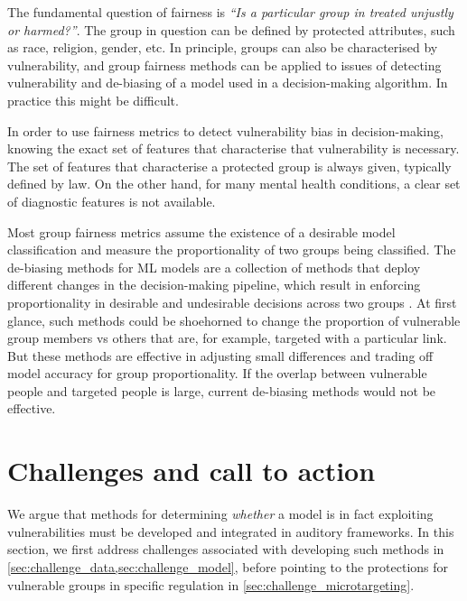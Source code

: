 \documentclass[11pt,theapa]{article}
\theoremstyle{plain}
\begin{document}
The fundamental question of fairness is \emph{``Is a particular group in treated unjustly or harmed?''}. The group in question can be defined by protected attributes, such as race, religion, gender, etc. In principle, groups can also be characterised by vulnerability, and group fairness methods can be applied to issues of detecting vulnerability and de-biasing of a model used in a decision-making algorithm. In practice this might be difficult.

In order to use fairness metrics to detect vulnerability bias in decision-making, knowing the exact set of features that characterise that vulnerability is necessary. The set of features that characterise a protected group is always given, typically defined by law. On the other hand,  for many mental health conditions, a clear set of diagnostic features is not available.  

Most group fairness metrics assume the existence of a desirable model classification and measure the proportionality of two groups being classified. The de-biasing methods for ML models are a collection of methods that deploy different changes in the decision-making pipeline, which result in enforcing proportionality in desirable and undesirable decisions across two groups \cite{Belamy2018}. At first glance, such methods could be shoehorned to change the proportion of vulnerable group members vs others that are, for example, targeted with a particular link. But these methods are effective in adjusting small differences and trading off model accuracy for group proportionality. If the overlap between vulnerable people and targeted people is large, current de-biasing methods would not be effective. 

\section{Challenges and call to action} \label{sec:shallenge}
We argue that methods for determining \emph{whether} a model is in fact exploiting vulnerabilities must be developed and integrated in auditory frameworks. In this section, we first address challenges associated with developing such methods in \cref{sec:challenge_data,sec:challenge_model}, before pointing to the protections for vulnerable groups in specific regulation in \cref{sec:challenge_microtargeting}.
\end{document}
